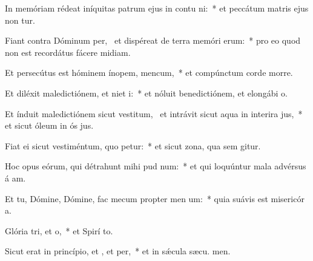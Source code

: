 \item In memóriam rédeat iníquitas patrum ejus in contu ni:~* et peccátum matris ejus non tur.
\item Fiant contra Dóminum per,~\pscross{} et dispéreat de terra memóri erum:~* pro eo quod non est recordátus fácere midiam.
\item Et persecútus est hóminem ínopem,  mencum,~* et compúnctum corde morre.
\item Et diléxit maledictiónem, et niet i:~* et nóluit benedictiónem, et elongábi  o.
\item Et índuit maledictiónem sicut vestitum,~\pscross{} et intrávit sicut aqua in interira jus,~* et sicut óleum in ós jus.
\item Fiat ei sicut vestiméntum, quo petur:~* et sicut zona, qua sem gitur.
\item Hoc opus eórum, qui détrahunt mihi pud num:~* et qui loquúntur mala advérsus á am.
\item Et tu, Dómine, Dómine, fac mecum propter men um:~* quia suávis est misericór a.
\item Glória tri, et o,~* et Spirí to.
\item Sicut erat in princípio, et , et per,~* et in sǽcula sæcu. men.
